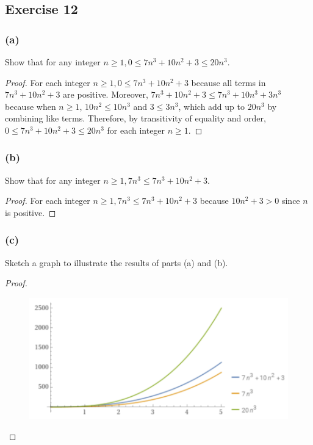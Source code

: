 \documentclass[14pt]{extarticle}
\begin{document}
\subsection{Exercise 12}
\subsubsection{(a)}
Show that for any integer \(n \geq 1, 0 \leq 7n^3 + 10n^2 + 3 \leq 20n^3\).

\begin{proof}
For each integer \(n \geq 1, 0 \leq 7n^3 + 10n^2 + 3\) because all terms in \(7n^3 + 10n^2 + 3\) are positive. Moreover, 
\(7n^3 + 10n^2 + 3 \leq 7n^3 + 10n^3 + 3n^3\) because when \(n \geq 1\), \(10n^2 \leq 10n^3\) and \(3 \leq 3n^3\), which add 
up to \(20n^3\) by combining like terms. Therefore, by transitivity of equality and order, \(0 \leq 7n^3 + 10n^2 + 3 
\leq 20n^3\) for each integer \(n \geq 1\).
\end{proof}

\subsubsection{(b)}
Show that for any integer \(n \geq 1, 7n^3 \leq 7n^3 + 10n^2 + 3\).

\begin{proof}
For each integer \(n \geq 1, 7n^3 \leq 7n^3 + 10n^2 + 3\) because \(10n^2 + 3 > 0\) since \(n\) is positive.
\end{proof}

\subsubsection{(c)}
Sketch a graph to illustrate the results of parts (a) and (b).
\begin{proof}
\begin{figure}[ht!]
\centering
\includegraphics[scale=0.5]{../images/11.2.12.c.png}
\end{figure}
\end{proof}
\end{document}
